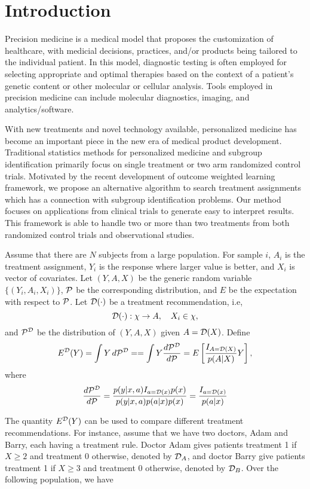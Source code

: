 \chapter{Introduction}

Precision medicine is a medical model that proposes the customization of
healthcare, with medicial decisions, practices, and/or products being tailored
to the individual patient. In this model, diagnostic testing is often
employed for selecting appropriate and optimal therapies based on the
context of a patient's genetic content or other molecular or cellular
analysis. Tools employed in precision medicine can include molecular
diagnostics, imaging, and analytics/software.

With new treatments and novel technology available, personalized medicine has
become an important piece in the new era of medical product
development. Traditional statistics methods for personalized medicine and
subgroup identification primarily focus on single treatment or two arm
randomized control trials. Motivated by the recent development of outcome
weighted learning framework, we propose an alternative algorithm to search
treatment assignments which has a connection with subgroup identification
problems. Our method focuses on applications from clinical trials to generate
easy to interpret results. This framework is able to handle two or more than two
treatments from both randomized control trials and observational studies.

Assume that there are $N$ subjects from a large population. For sample $i$,
$A_i$ is the treatment assignment, $Y_i$ is the response where larger value is
better, and $X_i$ is vector of covariates. Let $(Y, A, X)$ be the generic random
variable $\{(Y_i, A_i, X_i)\}$, ${\cal P}$ be the corresponding
distribution, and $E$ be the expectation with respect to ${\cal P}$. 
Let ${\cal D}(\cdot)$ be a treatment recommendation, i.e,
\[
  {\cal D(\cdot)}: \chi \to A, \quad X_i \in \chi,
\]
and ${\cal P^{\cal D}}$ be the distribution of $(Y, A, X)$ given $A = {\cal D}(X)$. 
Define
\[
E^{\cal D}(Y) = \int Y \, d{\cal P}^{\cal D} =
= \int Y \frac{d {\cal P}^{\cal D}}{d {\cal P}}
= E \left [
  \frac{I_{A = {\cal D}(X)}}{p(A|X)} Y
    \right], 
\]
where 
\[
\frac{d {\cal P}^{\cal D}}{d {\cal P}} =
\frac{p(y|x, a) I_{a = {\cal D}(x)} p(x)}{p(y|x, a) p(a|x)p(x)} =
\frac{I_{a = {\cal D}(x)}}{p(a|x)}
\]

The quantity $E^{{\cal D}}(Y)$ can be used to compare different treatment
recommendations. For instance, assume that we have two doctors, Adam and Barry,
each having a treatment rule. Doctor Adam gives patients treatment 1 if
$X \geq 2$ and treatment 0 otherwise, denoted by ${\cal D}_A$, and doctor Barry give
patients treatment 1 if $X \geq 3$ and treatment 0 otherwise, denoted by
${\cal D}_B$. Over the following population, we have

